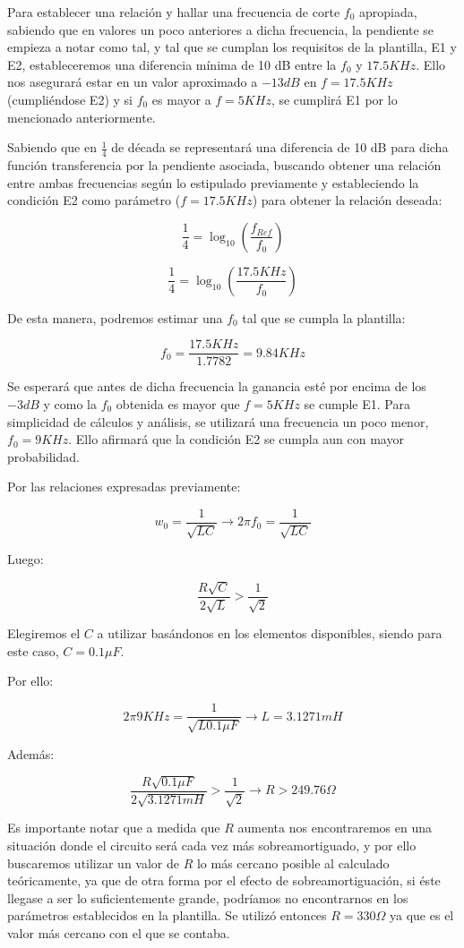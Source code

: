 Para establecer una relación y hallar una frecuencia de corte $f_0$ apropiada, 
sabiendo que en valores un poco anteriores a dicha frecuencia, la pendiente se empieza a notar como tal, y tal que se cumplan los requisitos
de la plantilla, E1 y E2, estableceremos una diferencia mínima de 10 dB entre la $f_0$ y $17.5 KHz$. Ello nos asegurará estar en un valor aproximado a $-13 dB$ en $f=17.5 KHz$ (cumpliéndose E2) y si
$f_0$ es mayor a $f=5KHz$, se cumplirá E1 por lo mencionado anteriormente.

Sabiendo que en $\frac{1}{4}$ de década se representará una diferencia de 10 dB para dicha función transferencia por la pendiente asociada, buscando obtener una
relación entre ambas frecuencias según lo estipulado previamente y estableciendo la condición E2 como parámetro ($f=17.5 KHz$) para obtener la relación deseada:

$$\frac{1}{4}=\log_{10}(\frac{f_{Ref}}{f_0})$$

$$\frac{1}{4}=\log_{10}(\frac{17.5KHz}{f_0})$$

De esta manera, podremos estimar una $f_0$ tal que se cumpla la plantilla:

$$f_0 = \frac{17.5KHz}{1.7782} = 9.84 KHz$$

Se esperará que antes de dicha frecuencia la ganancia esté por encima de los $-3dB$ y como la $f_0$ obtenida es mayor que $f=5KHz$ se cumple E1.
Para simplicidad de cálculos y análisis, se utilizará una frecuencia un poco menor, $f_0=9 KHz$. Ello afirmará que la condición E2 se cumpla aun con mayor
probabilidad.

Por las relaciones expresadas previamente:

$$w_0=\frac{1}{\sqrt{LC}} \longrightarrow 2\pi f_0=\frac{1}{\sqrt{LC}}$$

Luego:

$$\frac{R\sqrt{C}}{2\sqrt{L}} > \frac{1}{\sqrt{2}}$$

Elegiremos el $C$ a utilizar basándonos en los elementos disponibles, siendo para este caso,
$C=0.1\mu F$.

Por ello:

$$2\pi 9KHz=\frac{1}{\sqrt{L0.1 \mu F}} \longrightarrow L = 3.1271 mH$$

Además:

$$\frac{R\sqrt{0.1\mu F}}{2\sqrt{3.1271mH}} > \frac{1}{\sqrt{2}} \longrightarrow R > 249.76 \Omega $$

Es importante notar que a medida que $R$ aumenta nos encontraremos en una situación donde el circuito será
cada vez más sobreamortiguado, y por ello buscaremos utilizar un valor de $R$ lo más cercano posible al calculado teóricamente, ya que de otra forma
por el efecto de sobreamortiguación, si éste llegase a ser lo suficientemente grande,
podríamos no encontrarnos en los parámetros establecidos en la plantilla. 
Se utilizó entonces $R= 330 \Omega$ ya que es el valor más cercano con el que se contaba.



